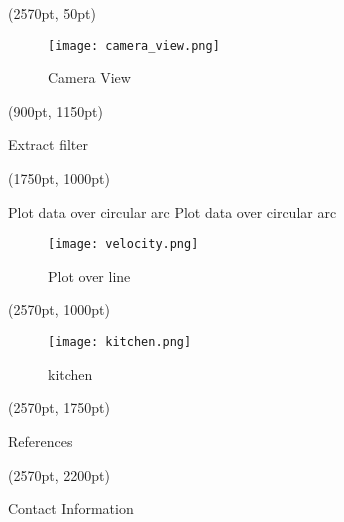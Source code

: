\documentclass[final]{beamer}
\begin{document}
\begin{textblock*}{800pt}(2570pt, 50pt)
\begin{figure}
\texttt{[image: camera\_view.png]}
\caption{Camera View}
\end{figure}
\end{textblock*}

\begin{textblock*}{800pt}(900pt, 1150pt)
\begin{block}{Extract filter}
\end{block}
\end{textblock*}

\begin{textblock*}{800pt}(1750pt, 1000pt)
\begin{block}{Plot data over circular arc}
Plot data over circular arc
\begin{figure}
\texttt{[image: velocity.png]}
\caption{Plot over line}
\end{figure}
\end{block}
\end{textblock*}

\begin{textblock*}{800pt}(2570pt, 1000pt)
\begin{figure}
\texttt{[image: kitchen.png]}
\caption{kitchen}
\end{figure}
\end{textblock*}

\begin{textblock*}{800pt}(2570pt, 1750pt)
\begin{block}{References}
\end{block}
\end{textblock*}

\begin{textblock*}{800pt}(2570pt, 2200pt)
\begin{block}{Contact Information}
\end{block}
\end{textblock*}
\end{document}
